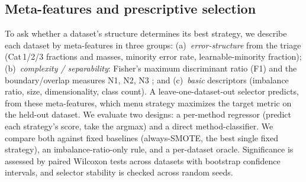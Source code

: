 \subsection{Meta-features and prescriptive selection}\label{sec:method:selection}

To ask whether a dataset's structure determines its best strategy, we describe
each dataset by meta-features in three groups: (a)~\emph{error-structure} from the
triage (Cat\,1/2/3 fractions and masses, minority error rate, learnable-minority
fraction); (b)~\emph{complexity / separability}: Fisher's maximum discriminant
ratio (F1) and the boundary/overlap measures N1, N2, N3 \cite{komorniczak2022data};
and (c)~\emph{basic} descriptors (imbalance ratio, size, dimensionality, class
count). A leave-one-dataset-out selector predicts, from these meta-features, which
menu strategy maximizes the target metric on the held-out dataset. We evaluate two
designs: a per-method regressor (predict each strategy's score, take the
argmax) and a direct method-classifier. We compare both against fixed baselines (always-SMOTE,
the best single fixed strategy), an imbalance-ratio-only rule, and a per-dataset
oracle. Significance is assessed by paired Wilcoxon tests across datasets with
bootstrap confidence intervals, and selector stability is checked across random
seeds.

